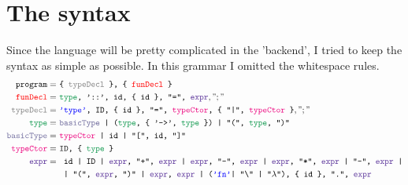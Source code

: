\documentclass{article}
\begin{document}
	\section{The syntax}
	Since the language will be pretty complicated in the 'backend', I tried to keep the syntax as simple as possible. In this grammar I omitted the whitespace rules.
	\begin{align*}
	\texttt{program}  =\ & \texttt{\{ \color{gray}typeDecl \color{black} \}, \{ \color{red}funDecl \color{black} \}}\\
	\texttt{\color{red}funDecl\color{black}} =\ & \texttt{\color{ForestGreen}type\color{black}, '::', id, \{ id \}, "=", \color{RoyalPurple}expr\color{black}}, ";"\\
	\texttt{\color{gray}typeDecl\color{black}} =\ &\texttt{\color{blue}'type'\color{black}, ID, \{ id \}, "=", \color{RubineRed}typeCtor\color{black}, \{ "|", \color{RubineRed}typeCtor \color{black} \}}, ";"\\
	\texttt{\color{ForestGreen}type\color{black}} =\ &\texttt{\color{CadetBlue}basicType \color{black} | (\color{ForestGreen}type\color{black}, \{ '->', \color{ForestGreen}type \color{black} \}) | "(", \color{ForestGreen}type\color{black}, ")"}\\
	\texttt{\color{CadetBlue}basicType} =\ &	\texttt{\color{RubineRed}typeCtor \color{black}| id | "[", id, "]"}\\
	\texttt{\color{RubineRed}typeCtor\color{black}} =\ & \texttt{ID, \{ \color{ForestGreen}type \color{black} \}}\\
	\texttt{\color{RoyalPurple}expr\color{black}} =\ &  \texttt{
		id
		| ID
		| \color{RoyalPurple}expr\color{black}, "+", \color{RoyalPurple}expr \color{black} 
		| \color{RoyalPurple}expr\color{black}, "-", \color{RoyalPurple}expr \color{black} 
		| \color{RoyalPurple}expr\color{black}, "*", \color{RoyalPurple}expr \color{black}
		| "-", \color{RoyalPurple}expr \color{black}
		|}\\
	&\texttt{
		| "(", \color{RoyalPurple}expr\color{black}, ")" 
		| \color{RoyalPurple}expr\color{black}, \color{RoyalPurple}expr \color{black} 
		| (\color{blue}'fn'\color{black} | "\char`\\" | "$\lambda$"), \{ id \}, ".", \color{RoyalPurple}expr \color{black}
}
\end{align*}
\end{document}
